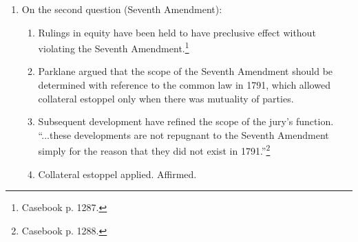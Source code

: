 \begin{enumerate}
\begin{enumerate}
        earlier hearing):
        \begin{enumerate}
            \item \emph{Defensive} collateral estoppel: a plaintiff cannot 
            assert a claim that he had previously litigated and lost against 
            another defendant. (See \emph{Blonder-Tongue Laboratories, Inc. v. 
            Univ. of Ill. Found.}, where the Court held that a patentee could 
            not relitigate the validity of a patent after it had already been 
            held invalid.)\footnote{Casebook pp. 1282--1283.}
            \item \emph{Offensive} collateral estoppel: a plaintiff seeks to 
            prevent a defendant from relitigating an issue resolved against it 
            in a prior hearing.\footnote{Casebook p. 1283.}
            \item Defensive collateral estoppel gives plaintiffs an incentive 
            to join all potential defendants in the first action, while 
            offensive collateral estoppel creates the opposite incentive.
            \item Offensive collateral estoppel may be unfair in some cases 
            because defendants may not have had the incentive to vigorously 
            litigate the issue in the earlier hearing.
            \item Offensive collateral estoppel was allowable in this case.
        \end{enumerate}
        \item On the second question (Seventh Amendment):
        \begin{enumerate}
            \item Rulings in equity have been held to have preclusive effect 
            without violating the Seventh Amendment.\footnote{Casebook p. 
            1287.}
            \item Parklane argued that the scope of the Seventh Amendment 
            should be determined with reference to the common law in 1791, 
            which allowed collateral estoppel only when there was mutuality of 
            parties.
            \item Subsequent development have refined the scope of the jury's 
            function. ``...these developments are not repugnant to the Seventh 
            Amendment simply for the reason that they did not exist in 
            1791.''\footnote{Casebook p. 1288.}
            \item Collateral estoppel applied. Affirmed. 

\end{enumerate}
\end{enumerate}
\end{enumerate}
